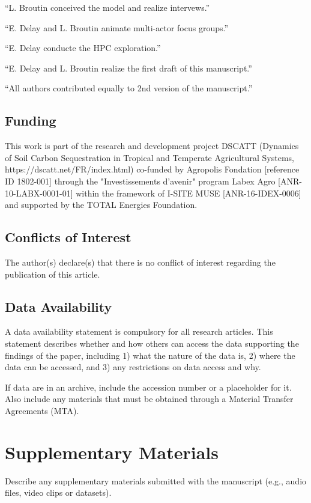 \documentclass{article}
\begin{document}
``L. Broutin conceived the model and realize intervews.''

``E. Delay and L. Broutin animate multi-actor focus groups.''

``E. Delay conducte the HPC exploration.''

``E. Delay and L. Broutin realize the first draft of this manuscript.''

``All authors contributed equally to 2nd version of the manuscript.''

\subsection*{Funding}

This work is part of the research and development project DSCATT (Dynamics of Soil Carbon Sequestration in Tropical and Temperate Agricultural Systems, https://dscatt.net/FR/index.html) co-funded by Agropolis Fondation [reference ID 1802-001] through the "Investissements d'avenir" program Labex Agro [ANR-10-LABX-0001-01] within the framework of I-SITE MUSE [ANR-16-IDEX-0006] and supported by the TOTAL Energies Foundation.

\subsection*{Conflicts of Interest}
The author(s) declare(s) that there is no conflict of interest regarding the publication of this article.

\subsection*{Data Availability}
A data availability statement is compulsory for all research articles. This statement describes whether and how others can access the data supporting the findings of the paper, including 1) what the nature of the data is, 2) where the data can be accessed, and 3) any restrictions on data access and why.

If data are in an archive, include the accession number or a placeholder for it. Also include any materials that must be obtained through a Material Transfer Agreements (MTA). 

\section*{Supplementary Materials}
Describe any supplementary materials submitted with the manuscript (e.g., audio files, video clips or datasets). 
\end{document}
